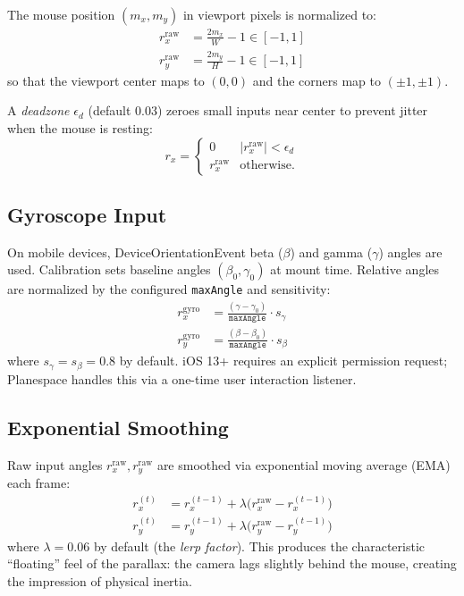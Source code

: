 \documentclass[10pt,twocolumn]{article}
\begin{document}
The mouse position $(m_x, m_y)$ in viewport pixels is normalized to:
\begin{align}
  r_x^{\mathrm{raw}} &= \frac{2 m_x}{W} - 1 \in [-1, 1] \\
  r_y^{\mathrm{raw}} &= \frac{2 m_y}{H} - 1 \in [-1, 1]
  \label{eq:mouse}
\end{align}
so that the viewport center maps to $(0, 0)$ and the corners map to $(\pm 1, \pm 1)$.

A \emph{deadzone} $\epsilon_d$ (default 0.03) zeroes small inputs near center
to prevent jitter when the mouse is resting:
\begin{equation}
  r_x = \begin{cases} 0 & |r_x^{\mathrm{raw}}| < \epsilon_d \\ r_x^{\mathrm{raw}} & \text{otherwise.} \end{cases}
\end{equation}

\subsection{Gyroscope Input}

On mobile devices, DeviceOrientationEvent beta ($\beta$) and gamma ($\gamma$)
angles are used. Calibration sets baseline angles $(\beta_0, \gamma_0)$ at
mount time. Relative angles are normalized by the configured \texttt{maxAngle}
and sensitivity:
\begin{align}
  r_x^{\mathrm{gyro}} &= \frac{(\gamma - \gamma_0)}{\mathtt{maxAngle}} \cdot s_\gamma \\
  r_y^{\mathrm{gyro}} &= \frac{(\beta - \beta_0)}{\mathtt{maxAngle}} \cdot s_\beta
  \label{eq:gyro}
\end{align}
where $s_\gamma = s_\beta = 0.8$ by default. iOS 13+ requires an explicit
permission request; Planespace handles this via a one-time user interaction
listener.

\subsection{Exponential Smoothing}

Raw input angles $r_x^{\mathrm{raw}}, r_y^{\mathrm{raw}}$ are smoothed via
exponential moving average (EMA) each frame:
\begin{align}
  r_x^{(t)} &= r_x^{(t-1)} + \lambda \bigl(r_x^{\mathrm{raw}} - r_x^{(t-1)}\bigr) \\
  r_y^{(t)} &= r_y^{(t-1)} + \lambda \bigl(r_y^{\mathrm{raw}} - r_y^{(t-1)}\bigr)
  \label{eq:lerp}
\end{align}
where $\lambda = 0.06$ by default (the \emph{lerp factor}). This produces
the characteristic ``floating'' feel of the parallax: the camera lags
slightly behind the mouse, creating the impression of physical inertia.
\end{document}
